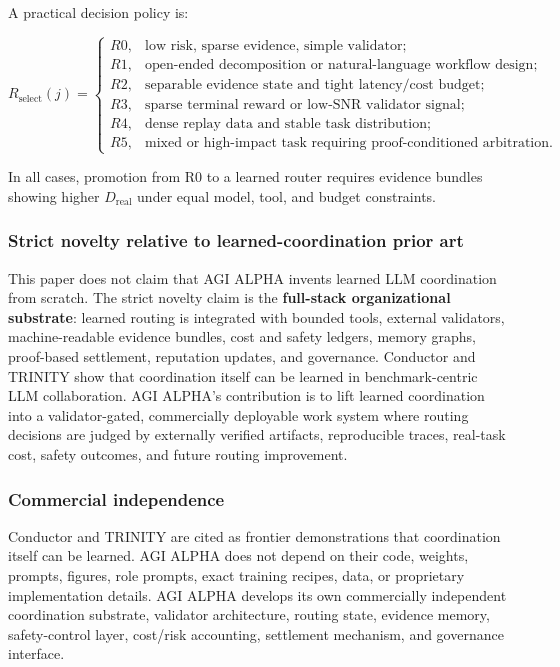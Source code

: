 \documentclass[11pt]{article}
\begin{document}
A practical decision policy is:

\[
R_{\text{select}}(j)=\begin{cases}
R0, & \text{low risk, sparse evidence, simple validator};\\
R1, & \text{open-ended decomposition or natural-language workflow design};\\
R2, & \text{separable evidence state and tight latency/cost budget};\\
R3, & \text{sparse terminal reward or low-SNR validator signal};\\
R4, & \text{dense replay data and stable task distribution};\\
R5, & \text{mixed or high-impact task requiring proof-conditioned arbitration}.
\end{cases}
\]

In all cases, promotion from R0 to a learned router requires evidence
bundles showing higher \(D_{\mathrm{real}}\) under equal model, tool, and
budget constraints.

\subsubsection{Strict novelty relative to learned-coordination prior art}\label{strict-novelty-relative-to-learned-coordination-prior-art}

This paper does not claim that AGI ALPHA invents learned LLM coordination from scratch. The strict novelty claim is the \textbf{full-stack organizational substrate}: learned routing is integrated with bounded tools, external validators, machine-readable evidence bundles, cost and safety ledgers, memory graphs, proof-based settlement, reputation updates, and governance. Conductor and TRINITY show that coordination itself can be learned in benchmark-centric LLM collaboration. AGI ALPHA's contribution is to lift learned coordination into a validator-gated, commercially deployable work system where routing decisions are judged by externally verified artifacts, reproducible traces, real-task cost, safety outcomes, and future routing improvement.

\subsubsection{Commercial independence}\label{commercial-independence}

Conductor and TRINITY are cited as frontier demonstrations that
coordination itself can be learned. AGI ALPHA does not depend on their
code, weights, prompts, figures, role prompts, exact training recipes,
data, or proprietary implementation details. AGI ALPHA develops its own
commercially independent coordination substrate, validator architecture,
routing state, evidence memory, safety-control layer, cost/risk
accounting, settlement mechanism, and governance interface.
\end{document}
